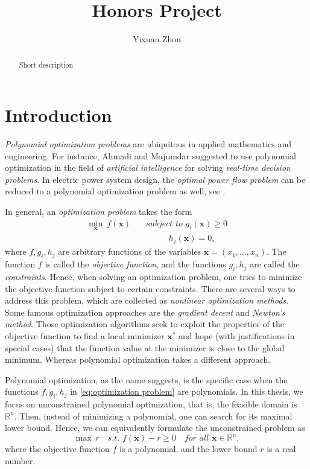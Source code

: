 \documentclass[12pt]{amsart}
\title{Honors Project}
\author{Yixuan Zhou} %
\numberwithin{equation}{section}
\theoremstyle{definition}
\numberwithin{thm}{section}
\begin{document}
 

\begin{abstract}
Short description
\end{abstract}

\maketitle


\section{Introduction} 

\emph{Polynomial optimization problems} are ubiquitous in applied mathematics and engineering. 
For instance, Ahmadi and Majumdar \cite{ahmadi2015applications} suggested to use
polynomial optimization in the field of \emph{artificial intelligence} for solving
\emph{real-time decision problems}. 
In electric power system design, the \emph{optimal power flow problem}
can be reduced to a polynomial optimization problem as well, see \cite{josz:tel-01478431}.

In general, an \emph{optimization problem} takes the form 
\begin{equation}
     \label{eq:optimization problem}
     \begin{split}
          \min_{\mathbf{x}} \ f(\mathbf{x}) & \quad \textit{subject to } g_i(\mathbf{x}) \geq 0 \\
          & \quad \quad \quad \text{ \ \ \ \ \ \  } h_j(\mathbf{x}) = 0, 
     \end{split}
 \end{equation}
where $f, g_i, h_j$ are arbitrary functions of the variables $\mathbf{x} = (x_1, ..., x_n)$. 
The function $f$ is called the \emph{objective function}, and the functions $g_i, h_j$ are called the \emph{constraints}.
Hence, when solving an optimization problem, one tries to minimize the objective function subject to certain constraints.
There are several ways to address this problem, which are collected as \emph{nonlinear optimization methods}. 
Some famous optimization approaches are the \emph{gradient decent} and \emph{Newton's method}. 
Those optimization algorithms seek to exploit the properties of the objective function to find a
local minimizer $\mathbf{x}^*$ and hope (with justifications in special cases) that the function value at the minimizer is close
to the global minimum. Whereas polynomial optimization takes a different approach.

Polynomial optimization, as the name suggests, is the specific case when the functions $f, g_i, h_j$ in \eqref{eq:optimization problem} are polynomials.
In this thesis, we focus on unconstrained polynomial optimization, that is, the feasible domain is $\mathbb{R}^n$.
Then, instead of minimizing a polynomial, one can search for its maximal lower bound.
Hence, we can equivalently formulate the unconstrained problem as 
\begin{equation*}
     \max \ r \quad \textit{s.t. } f(\mathbf{x}) - r \geq 0 \quad \textit{for all } \mathbf{x} \in \mathbb{R}^n,
 \end{equation*}
where the objective function $f$ is a polynomial, and the lower bound $r$ is a real number. 
\end{document}

